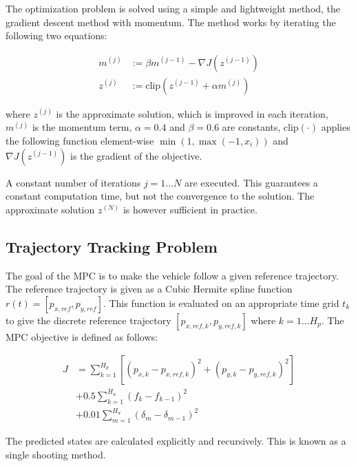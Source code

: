 \documentclass[12pt]{article}
\begin{document}
The optimization problem is solved using a simple and lightweight method, the gradient descent method with momentum.
The method works by iterating the following two equations:

\begin{align*}
m^{(j)} &:= \beta  m^{(j-1)} - \nabla J(z^{(j-1)}) \\
z^{(j)} &:= \text{clip}(z^{(j-1)} + \alpha  m^{(j)})
\end{align*}

where
$z^{(j)}$ is the approximate solution, which is improved in each iteration,
$m^{(j)}$ is the momentum term,
$\alpha = 0.4$ and $\beta = 0.6$ are constants,
$\text{clip}(\cdot)$ applies the following function element-wise $\min(1, \max(-1, x_i))$ and
$\nabla J(z^{(j-1)})$ is the gradient of the objective.

A constant number of iterations $j = 1 ... N$ are executed. 
This guarantees a constant computation time, but not the convergence to the solution.
The approximate solution $z^{(N)}$ is however sufficient in practice.

\subsection{Trajectory Tracking Problem}

The goal of the MPC is to make the vehicle follow a given reference trajectory.
The reference trajectory is given as a Cubic Hermite spline function $r(t) = [p_{x,ref}, p_{y,ref}]$.
This function is evaluated on an appropriate time grid $t_k$ to give the discrete reference trajectory $[p_{x,ref,k}, p_{y,ref,k}]$ where $k = 1 ... H_p$.
The MPC objective is defined as follows:

\begin{align*}
J &= \sum_{k=1}^{H_p} \left[ (p_{x,k} - p_{x,ref,k})^2 + (p_{y,k} - p_{y,ref,k})^2 \right] \\
  &+ 0.5 \sum_{k=1}^{H_u}  (f_k - f_{k-1})^2 \\
  &+ 0.01 \sum_{m=1}^{H_u}  (\delta_{m} - \delta_{m-1})^2
\end{align*}

The predicted states are calculated explicitly and recursively. This is known as a single shooting method.
\end{document}
